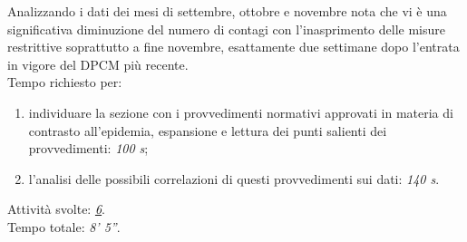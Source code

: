 \noindent
Analizzando i dati dei mesi di settembre, ottobre e novembre nota che vi è una significativa diminuzione del numero di contagi con l'inasprimento delle misure restrittive soprattutto a fine novembre, esattamente due settimane dopo l'entrata in vigore del DPCM più recente.\\
Tempo richiesto per:
\begin{enumerate}
    \item individuare la sezione con i provvedimenti normativi approvati in materia di contrasto all'epidemia, espansione e lettura dei punti salienti dei provvedimenti: \textit{100 s};
    \item l'analisi delle possibili correlazioni di questi provvedimenti sui dati: \textit{140 s}.
\end{enumerate}

\noindent
Attività svolte: \hyperref[itm:6]{\textit{6}}.\\ 
Tempo totale: \textit{8' 5''}. 
